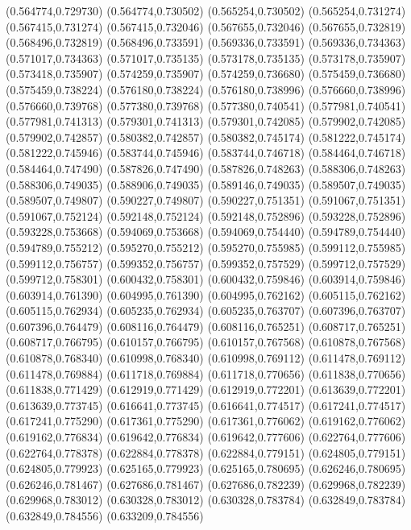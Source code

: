 (0.564774,0.729730)
(0.564774,0.730502)
(0.565254,0.730502)
(0.565254,0.731274)
(0.567415,0.731274)
(0.567415,0.732046)
(0.567655,0.732046)
(0.567655,0.732819)
(0.568496,0.732819)
(0.568496,0.733591)
(0.569336,0.733591)
(0.569336,0.734363)
(0.571017,0.734363)
(0.571017,0.735135)
(0.573178,0.735135)
(0.573178,0.735907)
(0.573418,0.735907)
(0.574259,0.735907)
(0.574259,0.736680)
(0.575459,0.736680)
(0.575459,0.738224)
(0.576180,0.738224)
(0.576180,0.738996)
(0.576660,0.738996)
(0.576660,0.739768)
(0.577380,0.739768)
(0.577380,0.740541)
(0.577981,0.740541)
(0.577981,0.741313)
(0.579301,0.741313)
(0.579301,0.742085)
(0.579902,0.742085)
(0.579902,0.742857)
(0.580382,0.742857)
(0.580382,0.745174)
(0.581222,0.745174)
(0.581222,0.745946)
(0.583744,0.745946)
(0.583744,0.746718)
(0.584464,0.746718)
(0.584464,0.747490)
(0.587826,0.747490)
(0.587826,0.748263)
(0.588306,0.748263)
(0.588306,0.749035)
(0.588906,0.749035)
(0.589146,0.749035)
(0.589507,0.749035)
(0.589507,0.749807)
(0.590227,0.749807)
(0.590227,0.751351)
(0.591067,0.751351)
(0.591067,0.752124)
(0.592148,0.752124)
(0.592148,0.752896)
(0.593228,0.752896)
(0.593228,0.753668)
(0.594069,0.753668)
(0.594069,0.754440)
(0.594789,0.754440)
(0.594789,0.755212)
(0.595270,0.755212)
(0.595270,0.755985)
(0.599112,0.755985)
(0.599112,0.756757)
(0.599352,0.756757)
(0.599352,0.757529)
(0.599712,0.757529)
(0.599712,0.758301)
(0.600432,0.758301)
(0.600432,0.759846)
(0.603914,0.759846)
(0.603914,0.761390)
(0.604995,0.761390)
(0.604995,0.762162)
(0.605115,0.762162)
(0.605115,0.762934)
(0.605235,0.762934)
(0.605235,0.763707)
(0.607396,0.763707)
(0.607396,0.764479)
(0.608116,0.764479)
(0.608116,0.765251)
(0.608717,0.765251)
(0.608717,0.766795)
(0.610157,0.766795)
(0.610157,0.767568)
(0.610878,0.767568)
(0.610878,0.768340)
(0.610998,0.768340)
(0.610998,0.769112)
(0.611478,0.769112)
(0.611478,0.769884)
(0.611718,0.769884)
(0.611718,0.770656)
(0.611838,0.770656)
(0.611838,0.771429)
(0.612919,0.771429)
(0.612919,0.772201)
(0.613639,0.772201)
(0.613639,0.773745)
(0.616641,0.773745)
(0.616641,0.774517)
(0.617241,0.774517)
(0.617241,0.775290)
(0.617361,0.775290)
(0.617361,0.776062)
(0.619162,0.776062)
(0.619162,0.776834)
(0.619642,0.776834)
(0.619642,0.777606)
(0.622764,0.777606)
(0.622764,0.778378)
(0.622884,0.778378)
(0.622884,0.779151)
(0.624805,0.779151)
(0.624805,0.779923)
(0.625165,0.779923)
(0.625165,0.780695)
(0.626246,0.780695)
(0.626246,0.781467)
(0.627686,0.781467)
(0.627686,0.782239)
(0.629968,0.782239)
(0.629968,0.783012)
(0.630328,0.783012)
(0.630328,0.783784)
(0.632849,0.783784)
(0.632849,0.784556)
(0.633209,0.784556)
